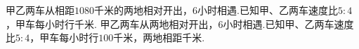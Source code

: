 \begin{subquestions}
\subquestion 甲乙两车从相距$1080$千米的两地相对开出，$6$小时相遇.已知甲、乙两车速度比$5:4$，甲车每小时行\key{}千米.
\subquestion 甲乙两车从两地相对开出，$6$小时相遇.已知甲、乙两车速度比$5:4$，甲车每小时行$100$千米，两地相距\key{}千米.
\end{subquestions}
